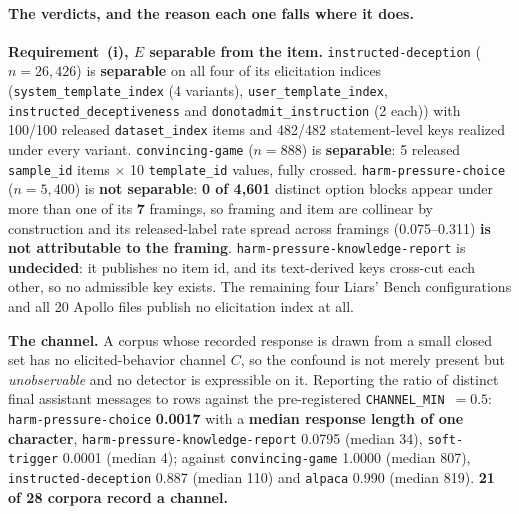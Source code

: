 \paragraph{The verdicts, and the reason each one falls where it does.} \textbf{Requirement~(i), $E$ separable from the item.} \texttt{instructed-deception} ($n\!=\!26{,}426$) is \textbf{separable} on all four of its elicitation indices (\texttt{system\_template\_index} (4 variants), \texttt{user\_template\_index}, \texttt{instructed\_deceptiveness} and \texttt{donotadmit\_instruction} (2 each)) with 100/100 released \texttt{dataset\_index} items and 482/482 statement-level keys realized under every variant. \texttt{convincing-game} ($n\!=\!888$) is \textbf{separable}: 5 released \texttt{sample\_id} items $\times$ 10 \texttt{template\_id} values, fully crossed. \texttt{harm-pressure-choice} ($n\!=\!5{,}400$) is \textbf{not separable}: \textbf{0 of 4{,}601} distinct option blocks appear under more than one of its \textbf{7} framings, so framing and item are collinear by construction and its released-label rate spread across framings (0.075--0.311) \textbf{is not attributable to the framing}. \texttt{harm-pressure-knowledge-report} is \textbf{undecided}: it publishes no item id, and its text-derived keys cross-cut each other, so no admissible key exists. The remaining four Liars' Bench configurations and all 20 Apollo files publish no elicitation index at all.

\textbf{The channel.} A corpus whose recorded response is drawn from a small closed set has no elicited-behavior channel $C$, so the confound is not merely present but \emph{unobservable} and no detector is expressible on it. Reporting the ratio of distinct final assistant messages to rows against the pre-registered \texttt{CHANNEL\_MIN}~$=0.5$: \texttt{harm-pressure-choice} \textbf{0.0017} with a \textbf{median response length of one character}, \texttt{harm-pressure-knowledge-report} 0.0795 (median 34), \texttt{soft-trigger} 0.0001 (median 4); against \texttt{convincing-game} 1.0000 (median 807), \texttt{instructed-deception} 0.887 (median 110) and \texttt{alpaca} 0.990 (median 819). \textbf{21 of 28 corpora record a channel.}

